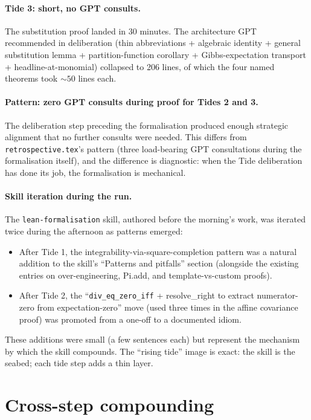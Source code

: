 \documentclass[11pt]{article}
\begin{document}
\paragraph{Tide 3: short, no GPT consults.} The substitution proof
landed in 30 minutes. The architecture GPT recommended in deliberation
(thin abbreviations + algebraic identity + general substitution lemma
+ partition-function corollary + Gibbs-expectation transport +
headline-at-monomial) collapsed to 206 lines, of which the four
named theorems took $\sim 50$ lines each.

\paragraph{Pattern: zero GPT consults during proof for Tides 2 and 3.}
The deliberation step preceding the formalisation produced enough
strategic alignment that no further consults were needed. This differs
from \texttt{retrospective.tex}'s pattern (three load-bearing GPT
consultations during the formalisation itself), and the difference is
diagnostic: when the Tide deliberation has done its job, the
formalisation is mechanical.

\paragraph{Skill iteration during the run.} The
\texttt{lean-formalisation} skill, authored before the morning's work,
was iterated twice during the afternoon as patterns emerged:
\begin{itemize}
\item After Tide 1, the integrability-via-square-completion pattern
was a natural addition to the skill's ``Patterns and pitfalls''
section (alongside the existing entries on over-engineering, Pi.add,
and template-vs-custom proofs).
\item After Tide 2, the ``\texttt{div\_eq\_zero\_iff} + resolve\_right
to extract numerator-zero from expectation-zero'' move (used three
times in the affine covariance proof) was promoted from a one-off to
a documented idiom.
\end{itemize}
These additions were small (a few sentences each) but represent the
mechanism by which the skill compounds. The
``rising tide'' image is exact: the skill is the seabed; each tide
step adds a thin layer.

\section{Cross-step compounding}
\end{document}
